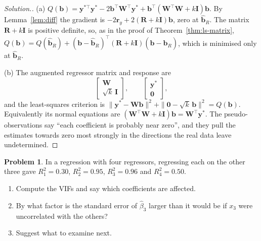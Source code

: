 \documentclass[11pt,a4paper]{article}
\numberwithin{equation}{section}
\theoremstyle{definition}
\newtheorem{problemx}{Problem}[subsection]
\newenvironment{problem}{\begin{problemx}}{\end{problemx}}
\newenvironment{solution}
  {\renewcommand{\qedsymbol}{}\begin{proof}[\textit{Solution}.]}
  {\end{proof}}
\begin{document}
\begin{solution}
(a) $Q(\mathbf{b}) = \mathbf{y}^{*\top}\mathbf{y}^* - 2\mathbf{b}^\top\mathbf{W}^\top\mathbf{y}^* + \mathbf{b}^\top(\mathbf{W}^\top\mathbf{W} + k\mathbf{I})\mathbf{b}$.
By Lemma~\ref{lem:diff} the gradient is $-2\mathbf{r}_y + 2(\mathbf{R} + k\mathbf{I})\mathbf{b}$, zero at $\hat{\mathbf{b}}_R$.
The matrix $\mathbf{R} + k\mathbf{I}$ is positive definite, so, as in the proof of Theorem~\ref{thm:ls-matrix},
$Q(\mathbf{b}) = Q(\hat{\mathbf{b}}_R) + (\mathbf{b} - \hat{\mathbf{b}}_R)^\top(\mathbf{R} + k\mathbf{I})(\mathbf{b} - \hat{\mathbf{b}}_R)$, which is
minimised only at $\hat{\mathbf{b}}_R$.

(b) The augmented regressor matrix and response are
\[
\begin{bmatrix} \mathbf{W} \\ \sqrt{k}\,\mathbf{I} \end{bmatrix} , \qquad \begin{bmatrix} \mathbf{y}^* \\ \mathbf{0} \end{bmatrix} ,
\]
and the least-squares criterion is $\|\mathbf{y}^* - \mathbf{Wb}\|^2 + \|\mathbf{0} - \sqrt{k}\,\mathbf{b}\|^2 = Q(\mathbf{b})$. Equivalently its normal equations are
$(\mathbf{W}^\top\mathbf{W} + k\mathbf{I})\mathbf{b} = \mathbf{W}^\top\mathbf{y}^*$. The pseudo-observations say ``each coefficient is
probably near zero'', and they pull the estimates towards zero most strongly in the directions the real
data leave undetermined.
\end{solution}

\begin{problem}\label{prob:vif-from-r2}
In a regression with four regressors, regressing each on the other three gave
$R_1^2 = 0.30$, $R_2^2 = 0.95$, $R_3^2 = 0.96$ and $R_4^2 = 0.50$.
\begin{enumerate}[label=(\alph*)]
\item Compute the VIFs and say which coefficients are affected.
\item By what factor is the standard error of $\hat\beta_3$ larger than it would be if $x_3$ were
uncorrelated with the others?
\item Suggest what to examine next.
\end{enumerate}
\end{problem}
\end{document}
